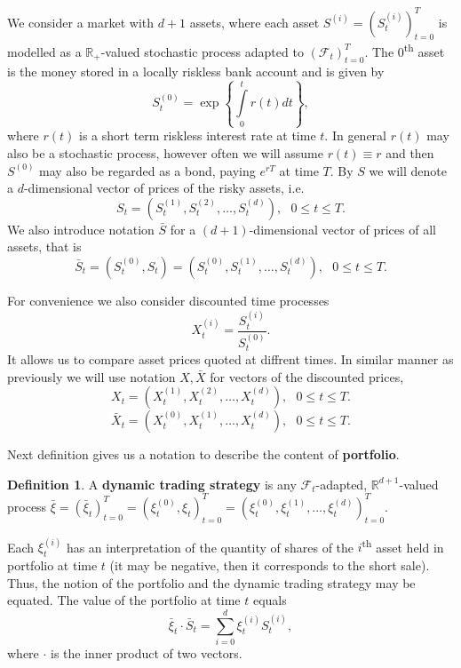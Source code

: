 \documentclass[a4paper,12pt, oneside]{book}
\theoremstyle{definition}
\newtheorem{mydef}{Definition}[section]
\theoremstyle{remark}
\def\R{{\mathbb{R}}}
\def\Sa{\bar{S}}
\def\Xa{\bar{X}}
\def\xia{\bar{\xi}}
\begin{document}
We consider a market with $d+1$ assets, where each asset $S^{(i)} = (S^{(i)}_t)_{t=0}^T$ is modelled as a $\R_+$-valued stochastic process adapted to $(\mathcal{F}_t)_{t=0}^T$. The $0$\textsuperscript{th} asset is the money stored in a locally riskless bank account and is given by 
\[S^{(0)}_t = \exp\left\{ \int\limits_0^t r(t)dt \right\},\]
where $r(t)$ is a short term riskless interest rate at time $t$. In general $r(t)$ may also be a stochastic process, however often we will assume $r(t) \equiv r$ and then $S^{(0)}$ may also be regarded as a bond, paying $e^{rT}$ at time $T$. By $S$ we will denote a $d$-dimensional vector of prices of the risky assets, i.e.
\begin{equation*}
 S_t = (S^{(1)}_t, S^{(2)}_t, \ldots, S^{(d)}_t), \ \ \ 0 \leq t \leq T.
\end{equation*}
We also introduce notation $\Sa$ for a $(d+1)$-dimensional vector of prices of all assets, that is
\begin{equation*}
 \Sa_t = (S^{(0)}_t, S_t) = (S^{(0)}_t, S^{(1)}_t, \ldots, S^{(d)}_t), \ \ \ 0 \leq t \leq T.
\end{equation*}

For convenience we also consider discounted time processes
\[ X^{(i)}_t = \frac{S^{(i)}_t}{S^{(0)}_t}. \]
It allows us to compare asset prices quoted at diffrent times. In similar manner as previously we will use notation $X, \Xa$ for vectors of the discounted prices,
\begin{equation*}
 X_t = (X^{(1)}_t, X^{(2)}_t, \ldots, X^{(d)}_t), \ \ \ 0 \leq t \leq T.
\end{equation*}
\begin{equation*}
 \Xa_t = (X^{(0)}_t, X^{(1)}_t, \ldots, X^{(d)}_t), \ \ \ 0 \leq t \leq T.
\end{equation*}

Next definition gives us a notation to describe the content of \textbf{portfolio}.
\begin{mydef}
A \textbf{dynamic trading strategy} is any $\mathcal{F}_t$-adapted,  $\R^{d+1}$-valued process $\xia = (\xia_t)_{t=0}^T = (\xi^{(0)}_t, \xi_t)_{t=0}^T = (\xi^{(0)}_t, \xi^{(1)}_t, \ldots, \xi^{(d)}_t)_{t=0}^T$.
\end{mydef}
Each $\xi^{(i)}_t$ has an interpretation of the quantity of shares of the $i$\textsuperscript{th} asset held in portfolio at time $t$ (it may be negative, then it corresponds to the short sale). Thus, the notion of the portfolio and the dynamic trading strategy may be equated. The value of the portfolio at time $t$ equals
\[\xia_t \cdot \Sa_t = \sum\limits_{i=0}^d \xi^{(i)}_t S^{(i)}_t,\]
where $\cdot$ is the inner product of two vectors.
\end{document}
